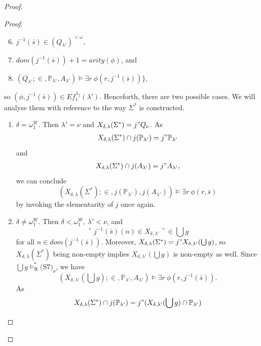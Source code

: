 \documentclass[12pt, twoside]{memoir}
\numberwithin{equation}{section}
\theoremstyle{definition}
\theoremstyle{remark}
\theoremstyle{definition}
\theoremstyle{definition}
\theoremstyle{definition}
\theoremstyle{remark}
\newcommand{\eq}{=}
\begin{document}
\begin{proof}
\begin{proof}
\begin{enumerate}[label=<$k$> $\eq$ \arabic* :, leftmargin=70pt]
    \begin{enumerate}[label=(\alph*)]
        \setcounter{enumii}{5}
        \item $j^{-1}(\bar{s}) \in (Q_{\lambda'})^{< \omega}$, 
        \item $dom(j^{-1}(\bar{s})) + 1 = arity(\phi)$, and
        \item $(Q_{\lambda'}; \in, \mathbb{P}_{\lambda'}, A_{\lambda'}) \models \exists r \ \phi(r, j^{-1}(\bar{s}))\}$,
    \end{enumerate}
    so $(\phi, j^{-1}(\bar{s})) \in Ef_1^{\lambda_f}(\lambda')$. Henceforth, there are two possible cases. We will analyse them with reference to the way $\Sigma^*$ is constructed. 
    \begin{enumerate}[label=Case \arabic*:, leftmargin=50pt]
        \item\label{c7c1} $\delta = \omega_1^W$. Then $\lambda' = \nu$ and $X_{\delta, \lambda}(\Sigma^*) = j" Q_{\nu}$. As 
        \begin{align*}
            X_{\delta, \lambda}(\Sigma^*) \cap j(\mathbb{P}_{\lambda'}) = j" \mathbb{P}_{\lambda'}
        \end{align*}
        and
        \begin{align*}
            X_{\delta, \lambda}(\Sigma^*) \cap j(A_{\lambda'}) = j" A_{\lambda'},
        \end{align*}
        we can conclude 
        \begin{equation*}
            (X_{\delta, \lambda}(\Sigma^*); \in, j(\mathbb{P}_{\lambda'}), j(A_{\lambda'})) \models \exists r \ \phi(r, \bar{s})
        \end{equation*} 
        by invoking the elementarity of $j$ once again.
        \item $\delta \neq \omega_1^W$. Then $\delta < \omega_1^W$, $\lambda' < \nu$, and $$\ulcorner j^{-1}(\bar{s})(n) \in \dot{X}_{\delta, \lambda'} \urcorner \in \bigcup g$$ for all $n \in dom(j^{-1}(\bar{s}))$. Moreover, $X_{\delta, \lambda}(\Sigma^*) = j" X_{\delta, \lambda'}(\bigcup g)$, so $X_{\delta, \lambda}(\Sigma^*)$ being non-empty implies $X_{\delta, \lambda'}(\bigcup g)$ is non-empty as well. Since $\bigcup g \models^*_{\mathfrak{A}} \text{(S7)}_{\nu}$, we have $$(X_{\delta, \lambda'}(\bigcup g); \in, \mathbb{P}_{\lambda'}, A_{\lambda'}) \models \exists r \ \phi(r, j^{-1}(\bar{s})).$$ As 
        \begin{align*}
            X_{\delta, \lambda}(\Sigma^*) \cap j(\mathbb{P}_{\lambda'}) = j" (X_{\delta, \lambda'}(\bigcup g) \cap \mathbb{P}_{\lambda'})

\end{align*}
\end{enumerate}
\end{enumerate}
\end{proof}
\end{proof}
\end{document}
